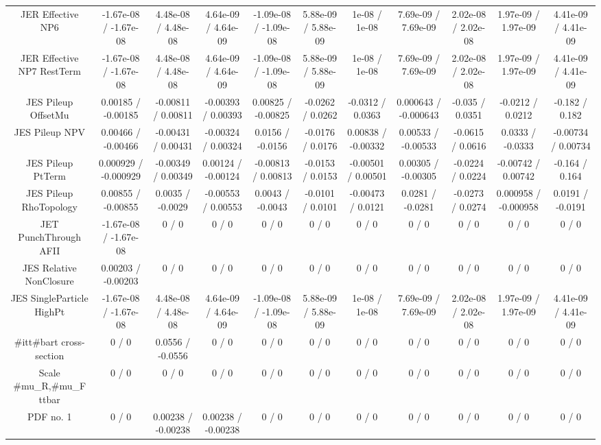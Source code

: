 \begin{table}[htbp]
\begin{center}
\begin{tabular}{|c|c|c|c|c|c|c|c|c|c|c|}
  JER Effective NP6 & -1.67e-08 / -1.67e-08 & 4.48e-08 / 4.48e-08 & 4.64e-09 / 4.64e-09 & -1.09e-08 / -1.09e-08 & 5.88e-09 / 5.88e-09 & 1e-08 / 1e-08 & 7.69e-09 / 7.69e-09 & 2.02e-08 / 2.02e-08 & 1.97e-09 / 1.97e-09 & 4.41e-09 / 4.41e-09 \\ 
  JER Effective NP7 RestTerm & -1.67e-08 / -1.67e-08 & 4.48e-08 / 4.48e-08 & 4.64e-09 / 4.64e-09 & -1.09e-08 / -1.09e-08 & 5.88e-09 / 5.88e-09 & 1e-08 / 1e-08 & 7.69e-09 / 7.69e-09 & 2.02e-08 / 2.02e-08 & 1.97e-09 / 1.97e-09 & 4.41e-09 / 4.41e-09 \\ 
  JES Pileup OffsetMu & 0.00185 / -0.00185 & -0.00811 / 0.00811 & -0.00393 / 0.00393 & 0.00825 / -0.00825 & -0.0262 / 0.0262 & -0.0312 / 0.0363 & 0.000643 / -0.000643 & -0.035 / 0.0351 & -0.0212 / 0.0212 & -0.182 / 0.182 \\ 
  JES Pileup NPV & 0.00466 / -0.00466 & -0.00431 / 0.00431 & -0.00324 / 0.00324 & 0.0156 / -0.0156 & -0.0176 / 0.0176 & 0.00838 / -0.00332 & 0.00533 / -0.00533 & -0.0615 / 0.0616 & 0.0333 / -0.0333 & -0.00734 / 0.00734 \\ 
  JES Pileup PtTerm & 0.000929 / -0.000929 & -0.00349 / 0.00349 & 0.00124 / -0.00124 & -0.00813 / 0.00813 & -0.0153 / 0.0153 & -0.00501 / 0.00501 & 0.00305 / -0.00305 & -0.0224 / 0.0224 & -0.00742 / 0.00742 & -0.164 / 0.164 \\ 
  JES Pileup RhoTopology & 0.00855 / -0.00855 & 0.0035 / -0.0029 & -0.00553 / 0.00553 & 0.0043 / -0.0043 & -0.0101 / 0.0101 & -0.00473 / 0.0121 & 0.0281 / -0.0281 & -0.0273 / 0.0274 & 0.000958 / -0.000958 & 0.0191 / -0.0191 \\ 
  JET PunchThrough AFII & -1.67e-08 / -1.67e-08 & 0 / 0 & 0 / 0 & 0 / 0 & 0 / 0 & 0 / 0 & 0 / 0 & 0 / 0 & 0 / 0 & 0 / 0 \\ 
  JES Relative NonClosure & 0.00203 / -0.00203 & 0 / 0 & 0 / 0 & 0 / 0 & 0 / 0 & 0 / 0 & 0 / 0 & 0 / 0 & 0 / 0 & 0 / 0 \\ 
  JES SingleParticle HighPt & -1.67e-08 / -1.67e-08 & 4.48e-08 / 4.48e-08 & 4.64e-09 / 4.64e-09 & -1.09e-08 / -1.09e-08 & 5.88e-09 / 5.88e-09 & 1e-08 / 1e-08 & 7.69e-09 / 7.69e-09 & 2.02e-08 / 2.02e-08 & 1.97e-09 / 1.97e-09 & 4.41e-09 / 4.41e-09 \\ 
  #it{t#bar{t}} cross-section & 0 / 0 & 0.0556 / -0.0556 & 0 / 0 & 0 / 0 & 0 / 0 & 0 / 0 & 0 / 0 & 0 / 0 & 0 / 0 & 0 / 0 \\ 
  Scale #mu_{R},#mu_{F} ttbar & 0 / 0 & 0 / 0 & 0 / 0 & 0 / 0 & 0 / 0 & 0 / 0 & 0 / 0 & 0 / 0 & 0 / 0 & 0 / 0 \\ 
  PDF no. 1 & 0 / 0 & 0.00238 / -0.00238 & 0.00238 / -0.00238 & 0 / 0 & 0 / 0 & 0 / 0 & 0 / 0 & 0 / 0 & 0 / 0 & 0 / 0 \\ 

\end{tabular}
\end{center}
\end{table}
